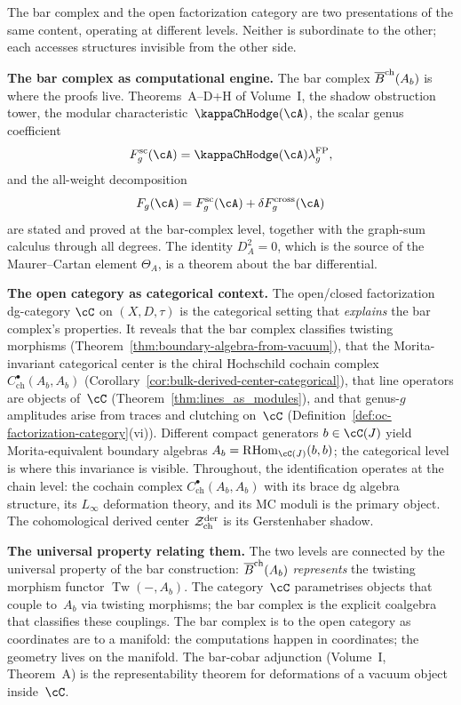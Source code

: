 \begin{remark}
\label{rem:corrected-big-picture}
The bar complex and the open factorization category are two
presentations of the same content, operating at
different levels. Neither is subordinate to the other; each
accesses structures invisible from the other side.

\medskip\noindent\textbf{The bar complex as computational engine.}
The bar complex $\overline{B}^{\mathrm{ch}}(A_b)$ is where the proofs
live. Theorems~A--D+H of Volume~I, the shadow obstruction tower,
the modular characteristic~$\kappaChHodge(\cA)$, the scalar genus
coefficient
\[
F_g^{\mathrm{sc}}(\cA)
=\kappaChHodge(\cA)\lambda_g^{\mathrm{FP}},
\]
and the all-weight decomposition
\[
F_g(\cA)=F_g^{\mathrm{sc}}(\cA)
+\delta F_g^{\mathrm{cross}}(\cA)
\]
are stated and proved at the bar-complex level, together with the
graph-sum calculus through all degrees. The identity $D_A^2 = 0$, which is the
source of the Maurer--Cartan element $\Theta_A$, is a theorem
about the bar differential.

\medskip\noindent\textbf{The open category as categorical context.}
The open/closed factorization dg-category $\cC$ on $(X,D,\tau)$
is the categorical setting that \emph{explains} the bar complex's
properties. It reveals that the bar complex classifies twisting
morphisms (Theorem~\ref{thm:boundary-algebra-from-vacuum}), that
the Morita-invariant categorical center is the chiral Hochschild
cochain complex
$C^\bullet_{\mathrm{ch}}(A_b, A_b)$
(Corollary~\ref{cor:bulk-derived-center-categorical}), that line
operators are objects of~$\cC$
(Theorem~\ref{thm:lines_as_modules}), and that genus-$g$
amplitudes arise from traces and clutching on~$\cC$
(Definition~\ref{def:oc-factorization-category}(vi)). Different
compact generators $b \in \cC(J)$ yield Morita-equivalent
boundary algebras $A_b = \RHom_{\cC(J)}(b,b)$; the categorical
level is where this invariance is visible. Throughout, the
identification operates at the chain level: the cochain complex
$C^\bullet_{\mathrm{ch}}(A_b, A_b)$ with its brace dg algebra
structure, its $L_\infty$ deformation theory, and its MC moduli
is the primary object. The cohomological derived center
$\mathcal{Z}^{\mathrm{der}}_{\mathrm{ch}}$ is its Gerstenhaber shadow.

\medskip\noindent\textbf{The universal property relating them.}
The two levels are connected by the universal property of the bar
construction: $\overline{B}^{\mathrm{ch}}(A_b)$ \emph{represents} the
twisting morphism functor $\operatorname{Tw}(-, A_b)$. The category~$\cC$
parametrises objects that couple to~$A_b$ via twisting morphisms;
the bar complex is the explicit coalgebra that classifies these
couplings. The bar complex is to the open category as coordinates
are to a manifold: the computations happen in coordinates; the
geometry lives on the manifold. The bar-cobar adjunction
(Volume~I, Theorem~A) is the representability theorem for
deformations of a vacuum object inside~$\cC$.
\end{remark}

